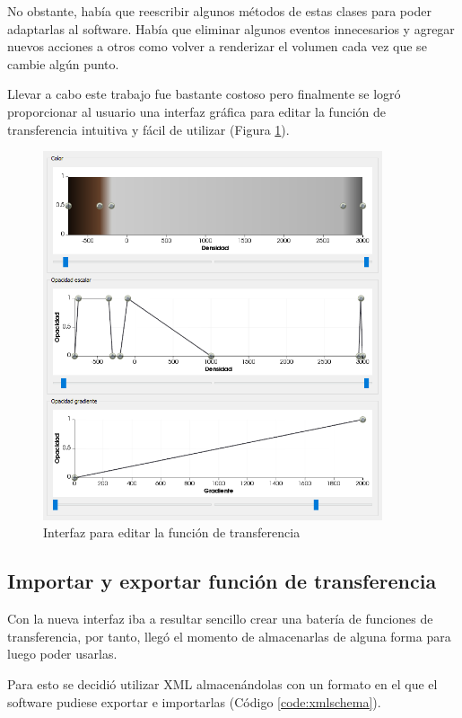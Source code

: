 No obstante, había que reescribir algunos métodos de estas clases para poder adaptarlas al software. Había que eliminar algunos eventos innecesarios y agregar nuevos acciones a otros como volver a renderizar el volumen cada vez que se cambie algún punto.

Llevar a cabo este trabajo fue bastante costoso pero finalmente se logró proporcionar al usuario una interfaz gráfica para editar la función de transferencia intuitiva y fácil de utilizar (Figura \ref{fig:gui_final_tf}).

\begin{figure}[H]
	\centering
	\includegraphics[width=10cm]{imagenes/gui_final_tf}
	\caption{Interfaz para editar la función de transferencia}
	\label{fig:gui_final_tf}
\end{figure}

\subsection{Importar y exportar función de transferencia}

Con la nueva interfaz iba a resultar sencillo crear una batería de funciones de transferencia, por tanto, llegó el momento de almacenarlas de alguna forma para luego poder usarlas.

Para esto se decidió utilizar XML almacenándolas con un formato en el que el software pudiese exportar e importarlas (Código \ref{code:xmlschema}).



